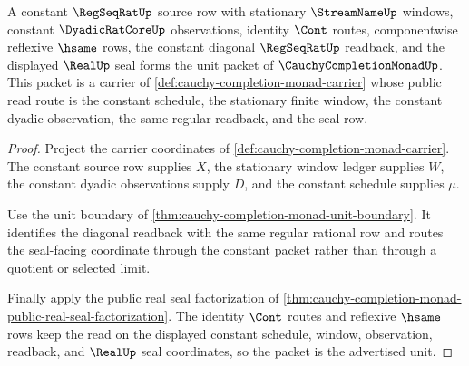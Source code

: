 \begin{theorem}
\label{thm:cauchy-completion-monad-regular-seal-unit}
A constant $\RegSeqRatUp$ source row with stationary $\StreamNameUp$ windows, constant $\DyadicRatCoreUp$ observations, identity $\Cont$ routes, componentwise reflexive $\hsame$ rows, the constant diagonal $\RegSeqRatUp$ readback, and the displayed $\RealUp$ seal forms the unit packet of $\CauchyCompletionMonadUp$. This packet is a carrier of \autoref{def:cauchy-completion-monad-carrier} whose public read route is the constant schedule, the stationary finite window, the constant dyadic observation, the same regular readback, and the seal row.
\end{theorem}
\begin{proof}
Project the carrier coordinates of \autoref{def:cauchy-completion-monad-carrier}. The constant source row supplies $X$, the stationary window ledger supplies $W$, the constant dyadic observations supply $D$, and the constant schedule supplies $\mu$.

Use the unit boundary of \autoref{thm:cauchy-completion-monad-unit-boundary}. It identifies the diagonal readback with the same regular rational row and routes the seal-facing coordinate through the constant packet rather than through a quotient or selected limit.

Finally apply the public real seal factorization of \autoref{thm:cauchy-completion-monad-public-real-seal-factorization}. The identity $\Cont$ routes and reflexive $\hsame$ rows keep the read on the displayed constant schedule, window, observation, readback, and $\RealUp$ seal coordinates, so the packet is the advertised unit.
\end{proof}

